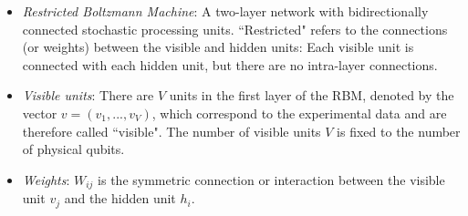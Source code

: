 \documentclass[submission, Phys, hidelnks]{SciPost}
\begin{document}
\begin{itemize}
\item {\it Restricted Boltzmann Machine}: A two-layer network with bidirectionally connected stochastic processing units. ``Restricted" refers to the connections (or weights) between the visible and hidden units: Each visible unit is connected with each hidden unit, but there are no intra-layer connections.

\item {\it Visible units}: There are $V$ units in the first layer of the RBM, denoted by the vector $v=(v_1, ..., v_V)$, which correspond to the experimental data and are therefore called ``visible". The number of visible units $V$ is fixed to the number of physical qubits.

\item {\it Weights}: $W_{ij}$ is the symmetric connection or interaction between the visible unit $v_j$ and the hidden unit $h_i$.

\end{itemize}



\nolinenumbers
\end{document}
